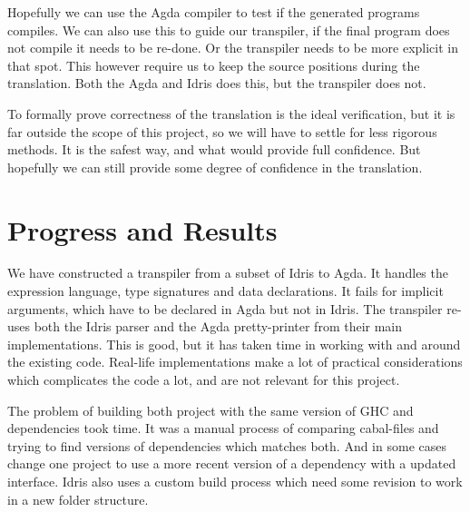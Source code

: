 \documentclass[parskip=half]{scrartcl}
\begin{document}
Hopefully we can use the Agda compiler to test if the generated programs
compiles. We can also use this to guide our transpiler, if the final
program does not compile it needs to be re-done. Or the transpiler needs to be
more explicit in that spot. This however require us to keep the source
positions during the translation. Both the Agda and Idris does this, but the
transpiler does not.

To formally prove correctness of the translation is the ideal verification, but
it is far outside the scope of this project, so we will have to settle for less
rigorous methods. It is the safest way, and what would provide full confidence.
But hopefully we can still provide some degree of confidence in the
translation.



\section{Progress and Results}

We have constructed a transpiler from a subset of Idris to Agda. It handles the
expression language, type signatures and data declarations.  It fails for
implicit arguments, which have to be declared in Agda but not in Idris. The
transpiler re-uses both the Idris parser and the Agda pretty-printer from their
main implementations.  This is good, but it has taken time in working with and
around the existing code.  Real-life implementations make a lot of practical
considerations which complicates the code a lot, and are not relevant for this
project.



The problem of building both project with the same version of GHC and
dependencies took time. It was a manual process of comparing cabal-files and
trying to find versions of dependencies which matches both. And in some cases
change one project to use a more recent version of a dependency with a updated
interface. Idris also uses a custom build process which need some revision to
work in a new folder structure.
\end{document}
